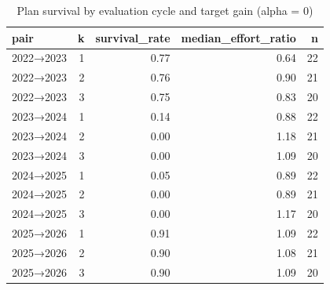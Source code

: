 \begin{table}[htbp]
\centering
\caption{Plan survival by evaluation cycle and target gain (alpha = 0)}
\label{tab:e2-survival}
\begin{tabular}{lrrrr}
\toprule
pair & k & survival\_rate & median\_effort\_ratio & n \\
\midrule
2022→2023 & 1 & 0.77 & 0.64 & 22 \\
2022→2023 & 2 & 0.76 & 0.90 & 21 \\
2022→2023 & 3 & 0.75 & 0.83 & 20 \\
2023→2024 & 1 & 0.14 & 0.88 & 22 \\
2023→2024 & 2 & 0.00 & 1.18 & 21 \\
2023→2024 & 3 & 0.00 & 1.09 & 20 \\
2024→2025 & 1 & 0.05 & 0.89 & 22 \\
2024→2025 & 2 & 0.00 & 0.89 & 21 \\
2024→2025 & 3 & 0.00 & 1.17 & 20 \\
2025→2026 & 1 & 0.91 & 1.09 & 22 \\
2025→2026 & 2 & 0.90 & 1.08 & 21 \\
2025→2026 & 3 & 0.90 & 1.09 & 20 \\
\bottomrule
\end{tabular}
\end{table}
